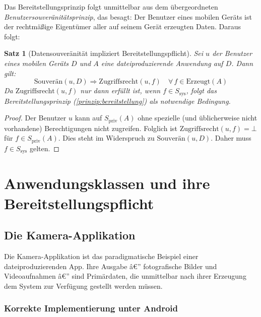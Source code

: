 ﻿\documentclass[12pt, a4paper]{article}
\newtheorem{satz}[definition]{Satz}
\begin{document}
Das Bereitstellungsprinzip folgt unmittelbar aus dem übergeordneten
\emph{Benutzersouveränitätsprinzip}, das besagt: Der Benutzer eines mobilen Geräts
ist der rechtmäßige Eigentümer aller auf seinem Gerät erzeugten Daten. Daraus folgt:

\begin{satz}[Datensouveränität impliziert Bereitstellungspflicht]
\label{satz:datensouveraenitaet}
Sei $u$ der Benutzer eines mobilen Geräts $D$ und $A$ eine dateiproduzierende
Anwendung auf $D$. Dann gilt:
\[
  \text{Souverän}(u, D) \Rightarrow \text{Zugriffsrecht}(u, f) \quad \forall\, f \in \text{Erzeugt}(A)
\]
Da $\text{Zugriffsrecht}(u, f)$ nur dann erfüllt ist, wenn $f \in S_{\text{sys}}$, folgt
das Bereitstellungsprinzip (\cref{prinzip:bereitstellung}) als notwendige Bedingung.
\end{satz}

\begin{proof}
Der Benutzer $u$ kann auf $S_{\text{priv}}(A)$ ohne spezielle (und üblicherweise nicht
vorhandene) Berechtigungen nicht zugreifen. Folglich ist $\text{Zugriffsrecht}(u, f) = \bot$
für $f \in S_{\text{priv}}(A)$. Dies steht im Widerspruch zu $\text{Souverän}(u, D)$.
Daher muss $f \in S_{\text{sys}}$ gelten.
\end{proof}

\section{Anwendungsklassen und ihre Bereitstellungspflicht}
\label{sec:anwendungsklassen}

\subsection{Die Kamera-Applikation}

Die Kamera-Applikation ist das paradigmatische Beispiel einer dateiproduzierenden App.
Ihre Ausgabe â€” fotografische Bilder und Videoaufnahmen â€” sind Primärdaten, die unmittelbar
nach ihrer Erzeugung dem System zur Verfügung gestellt werden müssen.

\subsubsection{Korrekte Implementierung unter Android}
\end{document}
